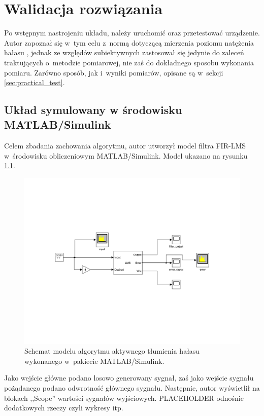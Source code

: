 \chapter{Walidacja rozwiązania}
\label{cha:tests}
Po wstępnym nastrojeniu układu, należy uruchomić oraz przetestować urządzenie. Autor zapoznał się w~tym celu z~normą dotyczącą mierzenia poziomu natężenia hałasu \cite{test_norm}, jednak ze względów subiektywnych zastosował się jedynie do zaleceń traktujących o~metodzie pomiarowej, nie zaś do dokładnego sposobu wykonania pomiaru. Zarówno sposób, jak i~wyniki pomiarów, opisane są w~sekcji \ref{sec:practical_test}.
\section{Układ symulowany w środowisku MATLAB/Simulink}
Celem zbadania zachowania algorytmu, autor utworzył model filtra FIR-LMS w~środowisku obliczeniowym MATLAB/Simulink. Model ukazano na rysunku \ref{fig:model_rys}.
\begin{figure}[h!]
	\centering
	\includegraphics[scale=0.5]{../Assets/model_anc_rys.pdf}
	\caption{Schemat modelu algorytmu aktywnego tłumienia hałasu wykonanego w~pakiecie MATLAB/Simulink.}
	\label{fig:model_rys}
\end{figure}

Jako wejście główne podano losowo generowany sygnał, zaś jako wejście sygnału pożądanego podano odwrotność głównego sygnału. Następnie, autor wyświetlił na blokach ,,Scope'' wartości sygnałów wyjściowych. PLACEHOLDER odnośnie dodatkowych rzeczy czyli wykresy itp.

